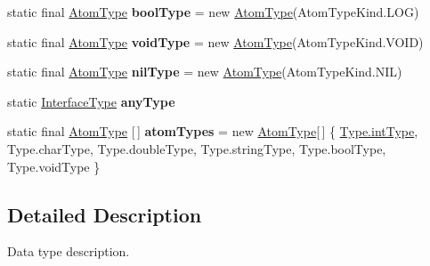 \begin{DoxyCompactItemize}
\item 
\mbox{\label{classcompiler_1_1seman_1_1type_1_1_type_a2cf8fb4a24c1fb29edf869b71c826122}} 
static final \hyperlink{classcompiler_1_1seman_1_1type_1_1_atom_type}{Atom\+Type} {\bfseries bool\+Type} = new \hyperlink{classcompiler_1_1seman_1_1type_1_1_atom_type}{Atom\+Type}(Atom\+Type\+Kind.\+L\+OG)
\item 
\mbox{\label{classcompiler_1_1seman_1_1type_1_1_type_a1974708f702ae9df8440b9a3cad56442}} 
static final \hyperlink{classcompiler_1_1seman_1_1type_1_1_atom_type}{Atom\+Type} {\bfseries void\+Type} = new \hyperlink{classcompiler_1_1seman_1_1type_1_1_atom_type}{Atom\+Type}(Atom\+Type\+Kind.\+V\+O\+ID)
\item 
\mbox{\label{classcompiler_1_1seman_1_1type_1_1_type_a82fc5dce40f12bf0c40d0a47d8afb043}} 
static final \hyperlink{classcompiler_1_1seman_1_1type_1_1_atom_type}{Atom\+Type} {\bfseries nil\+Type} = new \hyperlink{classcompiler_1_1seman_1_1type_1_1_atom_type}{Atom\+Type}(Atom\+Type\+Kind.\+N\+IL)
\item 
\mbox{\label{classcompiler_1_1seman_1_1type_1_1_type_a0c34f22827f3f8dfe0a7ec842cb7fd1e}} 
static \hyperlink{classcompiler_1_1seman_1_1type_1_1_interface_type}{Interface\+Type} {\bfseries any\+Type}
\item 
\mbox{\label{classcompiler_1_1seman_1_1type_1_1_type_a95973ccedc8804b40e79d81aa23810f3}} 
static final \hyperlink{classcompiler_1_1seman_1_1type_1_1_atom_type}{Atom\+Type} \mbox{[}$\,$\mbox{]} {\bfseries atom\+Types} = new \hyperlink{classcompiler_1_1seman_1_1type_1_1_atom_type}{Atom\+Type}\mbox{[}$\,$\mbox{]} \{ \hyperlink{classcompiler_1_1seman_1_1type_1_1_type_a2f51c2f983463c6c85b973a16a3fb81d}{Type.\+int\+Type}, Type.\+char\+Type, Type.\+double\+Type, Type.\+string\+Type, Type.\+bool\+Type, Type.\+void\+Type \}
\end{DoxyCompactItemize}


\subsection{Detailed Description}
Data type description. 

